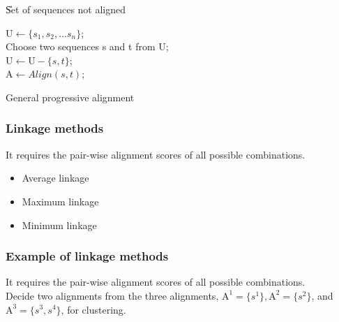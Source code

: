 \begin{algorithm}[H]
  
  \BlankLine
    
  \U{Set of sequences not aligned}
  
  \BlankLine \BlankLine
  
   $\mathrm{U} \leftarrow \{s_1, s_2, ... s_n\}$;\\
   Choose two sequences s and t from U;\\
   $\mathrm{U} \leftarrow \mathrm{U} - \{s, t\}$;\\
   $\mathrm{A} \leftarrow Align(s, t)$;

  \BlankLine \BlankLine


  \caption{General progressive alignment}

\end{algorithm}

%
%
\subsubsection*{Linkage methods}
It requires the pair-wise alignment scores of all possible combinations. 

\begin{itemize}
\item Average linkage
\item Maximum linkage
\item Minimum linkage
\end{itemize}

%
%
\subsubsection*{Example of linkage methods}
It requires the pair-wise alignment scores of all possible combinations. \\

\noindent
Decide two alignments from the three alignments, $\mathrm{A}^1 = \{s^1\}, \mathrm{A}^2 = \{s^2\}$, and $\mathrm{A}^3 = \{s^3, s^4\}$, for clustering.\\

